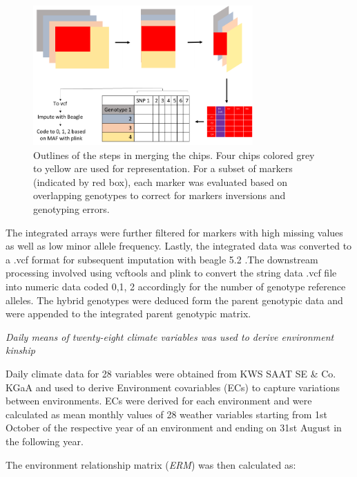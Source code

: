 \documentclass[english, biblatex]{lni}
\begin{document}
\begin{figure}[h]
    \centering
    \includegraphics[width=0.75\textwidth]{pipeline_marker}
    \caption{Outlines of the steps in merging the chips. Four chips colored grey to yellow are used for representation. For a subset of markers (indicated by red box), each marker was evaluated based on overlapping genotypes to correct for markers inversions and genotyping errors.}
    \label{fig_pipeline_marker}
\end{figure}

The integrated arrays were further filtered for markers with high missing values as well as low minor allele frequency. Lastly, the integrated data was converted to a .vcf format \cite{danecek2011variant} for subsequent imputation with beagle 5.2 \cite{browning2018one}.The downstream processing involved using vcftools \cite{danecek2011variant} and plink \cite{purcell2007plink} to convert the string data .vcf file into numeric data coded 0,1, 2 accordingly for the number of genotype reference alleles. The hybrid genotypes were deduced form the parent genotypic data and were appended to the integrated parent genotypic matrix.

\textit{Daily means of twenty-eight climate variables was used to derive environment kinship}

Daily climate data for 28 variables were obtained from KWS SAAT SE \& Co. KGaA and used to derive Environment covariables (ECs) to capture variations between environments. ECs were derived for each environment and were calculated as mean monthly values of 28 weather variables starting from 1st October of the respective year of an environment and ending on 31st August in the following year.

The environment relationship matrix (\textit{ERM}) was then calculated as:

\vspace{6pt}
\end{document}
